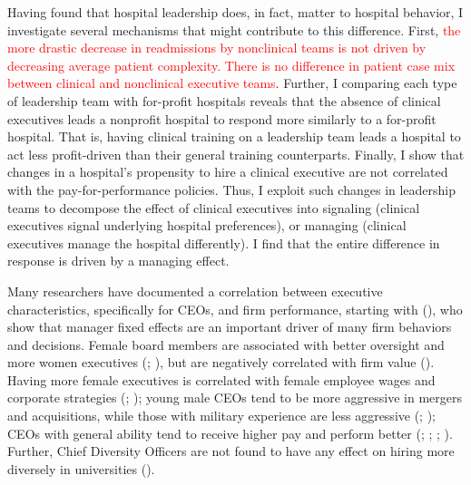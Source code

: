 \documentclass[12pt]{article}
\begin{document}
    Having found that hospital leadership does, in fact, matter to hospital behavior, I investigate several mechanisms that might contribute to this difference. First, \textcolor{red}{the more drastic decrease in readmissions by nonclinical teams is not driven by decreasing average patient complexity. There is no difference in patient case mix between clinical and nonclinical executive teams}. Further, I comparing each type of leadership team with for-profit hospitals reveals that the absence of clinical executives leads a nonprofit hospital to respond more similarly to a for-profit hospital. That is, having clinical training on a leadership team leads a hospital to act less profit-driven than their general training counterparts. Finally, I show that changes in a hospital's propensity to hire a clinical executive are not correlated with the pay-for-performance policies. Thus, I exploit such changes in leadership teams to decompose the effect of clinical executives into signaling (clinical executives signal underlying hospital preferences), or managing (clinical executives manage the hospital differently). I find that the entire difference in response is driven by a managing effect. 

    Many researchers have documented a correlation between executive characteristics, specifically for CEOs, and firm performance, starting with \citeauthor{bertrand2003managing} (\citeyear{bertrand2003managing}), who show that manager fixed effects are an important driver of many firm behaviors and decisions. Female board members are associated with better oversight and more women executives (\cite{matsa2011chipping}; \cite{adams2009women}), but are negatively correlated with firm value (\cite{ahern2012changing}). Having more female executives is correlated with female employee wages and corporate strategies (\cite{flabbi2019female}; \cite{matsa2013female}); young male CEOs tend to be more aggressive in mergers and acquisitions, while those with military experience are less aggressive (\cite{levi2010deal}; \cite{benmelech2015military}); CEOs with general ability tend to receive higher pay and perform better (\cite{kaplan2012ceo}; \cite{custodio2013generalists}; \cite{adams2018director}; \cite{frydman2019rising}). Further, Chief Diversity Officers are not found to have any effect on hiring more diversely in universities (\cite{bradley2022impact}). 
    
\end{document}
